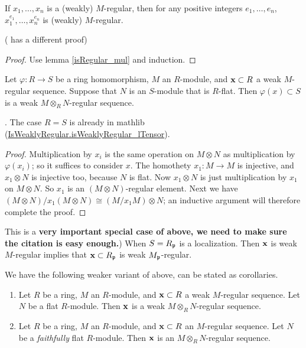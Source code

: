 	\begin{lemma}
		If $x_1, \dots, x_n$ is a (weakly) $M$-regular, then for any positive integers $e_1, \dots, e_n$, $x_1^{e_1},\dots, x_n^{e_n}$ is (weakly) $M$-regular.
		
		\cite[Exercise 1.1.10(b)]{BH} 
		
		(\cite[page 96]{matsumura-alg} has a different proof)
	\end{lemma}
	
	\begin{proof}
		Use lemma \ref{isRegular_mul} and induction.
	\end{proof}
	
	\begin{proposition}
		\label{P:regular sequence functoriality}
		Let $\varphi: R \to S$ be a ring homomorphism, $M$ an $R$-module, and $\mathbf{x} \subset R$ a weak $M$-regular sequence. Suppose that $N$ is an $S$-module that is $R$-flat.  Then $\varphi(x) \subset S$ is a weak $M \otimes_R N$-regular sequence.
		
		\cite[Proposition 1.1.2]{BH}. The case $R = S$ is already in mathlib (\href{https://leanprover-community.github.io/mathlib4_docs/Mathlib/RingTheory/Regular/RegularSequence.html#RingTheory.Sequence.IsWeaklyRegular.isWeaklyRegular_lTensor}{IsWeaklyRegular.isWeaklyRegular\_lTensor}).
		
	\end{proposition}
	
	\begin{proof}
		Multiplication by $x_i$ is the same operation on $M \otimes N$ as multiplication by $\varphi(x_i)$; so it suffices to consider $x$. The homothety $x_1: M \to M$ is injective, and $x_1 \otimes N$ is injective too, because $N$ is flat. Now $x_1 \otimes N$ is just multiplication by $x_1$ on $M \otimes N$. So $x_1$ is an $(M \otimes N)$-regular element. Next we have $(M \otimes N)/x_1(M \otimes N) \cong (M/x_1 M) \otimes N$; an inductive argument will therefore complete the proof.
	\end{proof}
	
	\begin{example}
		This is a {\bf very important special case of above, we need to make sure the citation is easy enough.}) When $S = R_{\mathfrak{p}}$ is a localization. Then $\mathbf{x}$ is weak $M$-regular implies that $\mathbf{x} \subset R_{\mathfrak{p}}$ is weak $M_{\mathfrak{p}}$-regular.
	\end{example}
	
	\begin{remark}
		We have the following weaker variant of above, can be stated as corollaries.
		\begin{enumerate}
			\item 
			Let $R$ be a ring, $M$ an $R$-module, and $\mathbf{x} \subset R$ a weak $M$-regular sequence. Let $N$ be a flat $R$-module. Then $\mathbf{x}$ is a weak $M \otimes_RN$-regular sequence. 
			\item
			Let $R$ be a ring, $M$ an $R$-module, and $\mathbf{x} \subset R$ an $M$-regular sequence. Let $N$ be a \emph{faithfully} flat $R$-module. Then $\mathbf{x}$ is an $M \otimes_RN$-regular sequence. 
		\end{enumerate}
	\end{remark}
	
